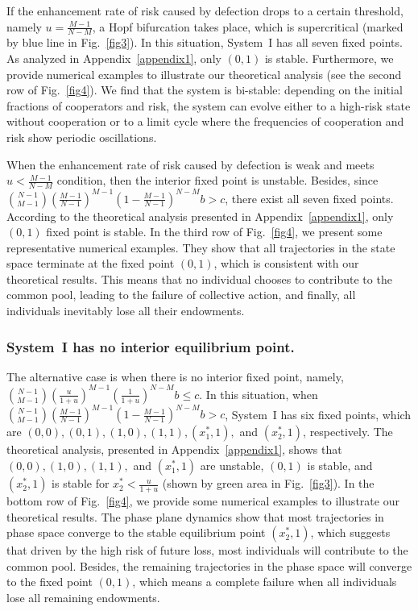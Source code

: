 \documentclass[9pt]{elife}
\begin{document}
If the enhancement rate of risk caused by defection drops to a certain threshold, namely $u=\frac{M-1}{N-M}$, a Hopf bifurcation takes place, which is supercritical (marked by blue line in Fig.~\ref{fig3}). In this situation, System~I has all seven fixed points. As analyzed in Appendix~\ref{appendix1}, only $(0, 1)$ is stable. Furthermore, we provide numerical examples to illustrate our theoretical analysis (see the second row of Fig.~\ref{fig4}). We find that the system is bi-stable: depending on the initial fractions of cooperators and risk, the system can evolve either to a high-risk state without cooperation or to a limit cycle where the frequencies of cooperation and risk show periodic oscillations. 

When the enhancement rate of risk caused by defection is weak and meets $u<\frac{M-1}{N-M}$ condition, then the interior fixed point is unstable. Besides, since $\binom{N-1}{M-1}(\frac{M-1}{N-1})^{M-1}(1-\frac{M-1}{N-1})^{N-M}b>c$, there exist all seven fixed points. According to the theoretical analysis presented in Appendix~\ref{appendix1}, only $(0, 1)$ fixed point is stable. In the third row of Fig.~\ref{fig4}, we present some representative numerical examples. They show that all trajectories in the state space terminate at the fixed point $(0, 1)$, which is consistent with our theoretical results. This means that no individual chooses to contribute to the common pool, leading to the failure of collective action, and finally, all individuals inevitably lose all their endowments.

\subsubsection{System~I has no interior equilibrium point.}

The alternative case is when there is no interior fixed point, namely, $\binom{N-1}{M-1}(\frac{u}{1+u})^{M-1}(\frac{1}{1+u})^{N-M}b\leq c$. In this situation, when $\binom{N-1}{M-1}(\frac{M-1}{N-1})^{M-1}(1-\frac{M-1}{N-1})^{N-M}b>c$, System~I has six fixed points, which are $(0, 0), (0, 1), (1 ,0), (1, 1), (x_{1}^{*},1),$ and $(x_{2}^{*},1)$, respectively. The theoretical analysis, presented in Appendix~\ref{appendix1}, shows that $(0, 0), (1 ,0), (1, 1),$ and $(x_{1}^{*},1)$ are unstable, $(0, 1)$ is stable, and $(x_{2}^{*},1)$ is stable for $x_{2}^{*}<\frac{u}{1+u}$ (shown by green area in Fig.~\ref{fig3}). In the bottom row of Fig.~\ref{fig4}, we provide some numerical examples to illustrate our theoretical results. The phase plane dynamics show that most trajectories in phase space converge to the stable equilibrium point $(x_{2}^{*},1)$, which suggests that driven by the high risk of future loss, most individuals will contribute to the common pool. Besides, the remaining trajectories in the phase space will converge to the fixed point $(0, 1)$, which means a complete failure when all individuals lose all remaining endowments.
\end{document}
